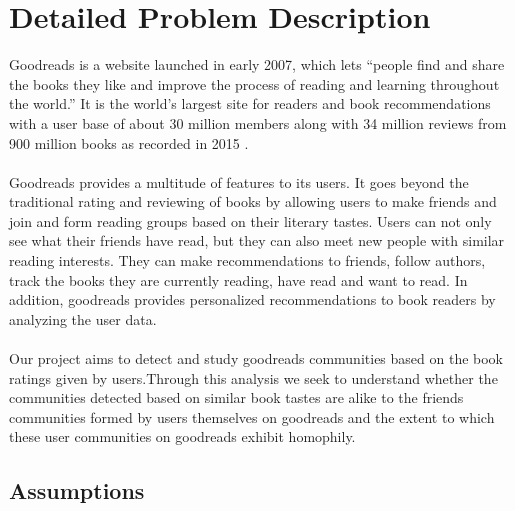 \documentclass[11pt]{article}
\begin{document}
\maketitle

\section{Detailed Problem Description}
Goodreads is a website launched in early 2007, which lets ``people find and share the books they like and improve the process of reading and learning throughout the world.'' It is the world's largest site for readers and book recommendations with a user base of about 30 million members along with 34 million reviews from 900 million books as recorded in 2015 \cite{goodreads:aboutus}.\\\\
Goodreads provides a multitude of features to its users. It goes beyond the traditional rating and reviewing of books by allowing users to make friends and join and form reading groups based on their literary tastes.
Users can not only see what their friends have read, but they can also meet new people with similar reading interests. They can make recommendations to friends, follow authors, track the books they are currently reading, have read and want to read.
In addition, goodreads provides personalized recommendations to book readers by analyzing the user data.\\\\
Our project aims to detect and study goodreads communities based on the book ratings given by users.Through this analysis we seek to understand whether the communities detected based on similar book tastes are alike to the friends communities formed by users themselves on goodreads and the extent to which these user communities on goodreads exhibit homophily.
\subsection{Assumptions}
\end{document}

